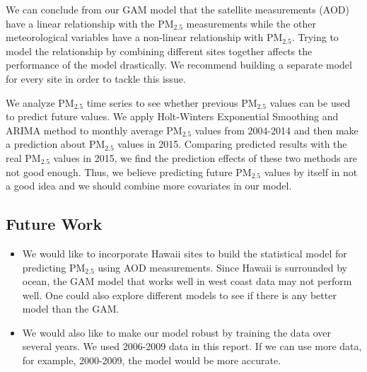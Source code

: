 \documentclass[10pt]{article}
\begin{document}
We can conclude from our GAM model that the satellite measurements (AOD)
have a linear relationship with the PM$_{2.5}$ measurements while the other
meteorological variables have a non-linear relationship with PM$_{2.5}$. Trying
to model the relationship by combining different sites together affects the
performance of the model drastically. We recommend building a separate model
for every site in order to tackle this issue.


We analyze PM$_{2.5}$ time series to see whether previous PM$_{2.5}$ values can
be used to predict future values.  We apply Holt-Winters Exponential Smoothing
and ARIMA method to monthly average PM$_{2.5}$ values from 2004-2014 and then
make a prediction about PM$_{2.5}$ values in 2015. Comparing predicted results
with the real PM$_{2.5}$ values in 2015, we find the prediction effects of
these two methods are not good enough. Thus, we believe predicting future
PM$_{2.5}$ values by itself in not a good idea and we should combine more
covariates in our model.  

\subsection{Future Work}

\begin{itemize}
\item We would like to incorporate Hawaii sites to build the statistical model
for predicting PM$_{2.5}$ using AOD measurements. Since Hawaii is surrounded by
ocean,  the GAM model that works well in west coast data may not perform well. 
One could also explore different models to see if there is any better model than the GAM.

\item We would also like to make our model robust by training the data over
several years.  We used 2006-2009 data in this report. If we can use more data,
for example, 2000-2009, the model would be more accurate.

\end{itemize}
\end{document}

